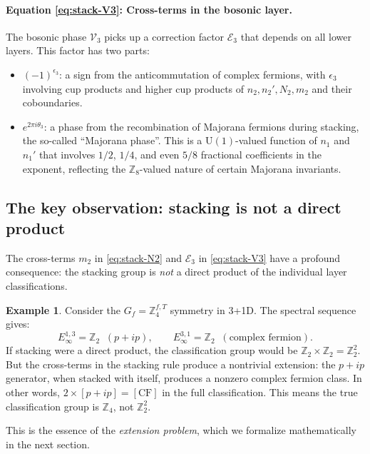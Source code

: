 \documentclass{SciPost}
\theoremstyle{definition}
\newtheorem{example}[theorem]{Example}
\newcommand{\Zt}{\mathbb{Z}_2}
\newcommand{\Zn}[1]{\mathbb{Z}_{#1}}
\newcommand{\U}{\mathrm{U}}
\newcommand{\Gf}{G_f}
\begin{document}
\paragraph{Equation \eqref{eq:stack-V3}: Cross-terms in the bosonic layer.}
The bosonic phase $\mathcal{V}_3$ picks up a correction factor $\mathcal{E}_3$ that depends on all lower layers.
This factor has two parts:
\begin{itemize}
    \item $(-1)^{\epsilon_3}$: a sign from the anticommutation of complex fermions, with $\epsilon_3$ involving cup products and higher cup products of $n_2, n_2', N_2, m_2$ and their coboundaries.
    \item $e^{2\pi i \theta_3}$: a phase from the recombination of Majorana fermions during stacking, the so-called ``Majorana phase''.
    This is a $\U(1)$-valued function of $n_1$ and $n_1'$ that involves $1/2$, $1/4$, and even $5/8$ fractional coefficients in the exponent, reflecting the $\Zn{8}$-valued nature of certain Majorana invariants.
\end{itemize}

\subsection{The key observation: stacking is not a direct product}
\label{subsec:key-observation}

The cross-terms $m_2$ in \eqref{eq:stack-N2} and $\mathcal{E}_3$ in \eqref{eq:stack-V3} have a profound consequence: the stacking group is \emph{not} a direct product of the individual layer classifications.

\begin{example}
Consider the $\Gf = \Zn{4}^{f,T}$ symmetry in 3+1D.
The spectral sequence gives:
\begin{equation}
E_\infty^{1,3} = \Zt \;\; (p+ip), \qquad E_\infty^{3,1} = \Zt \;\; (\text{complex fermion}).
\end{equation}
If stacking were a direct product, the classification group would be $\Zt \times \Zt = \Zn{2}^2$.
But the cross-terms in the stacking rule produce a nontrivial extension:
the $p+ip$ generator, when stacked with itself, produces a nonzero complex fermion class.
In other words, $2 \times [p+ip] = [\text{CF}]$ in the full classification.
This means the true classification group is $\Zn{4}$, not $\Zn{2}^2$.
\end{example}

This is the essence of the \emph{extension problem}, which we formalize mathematically in the next section.
\end{document}

